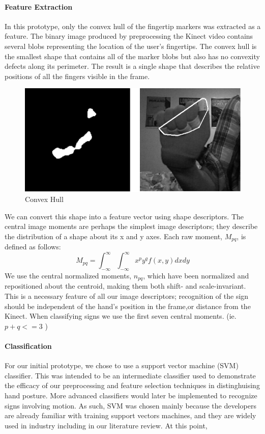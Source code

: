\documentclass[12pt]{article}
\begin{document}
\paragraph{Feature Extraction}
In this prototype, only the convex hull of the fingertip markers was extracted as a feature. The binary image produced by preprocessing the Kinect video contains several blobs representing the location of the user’s fingertips. The convex hull is the smallest shape that contains all of the marker blobs but also has no convexity defects along its perimeter. The result is a single shape that describes the relative positions of all the fingers visible in the frame.

\begin{figure}[h!]
  \centering
  \includegraphics[scale=0.7]{Hull.png}
  \caption{Convex Hull}
  \label{hull}
\end{figure}

We can convert this shape into a feature vector using shape descriptors. The central image moments are perhaps the simplest image descriptors; they describe the distribution of a shape about its x and y axes. Each raw moment, \(M_{pq}\), is defined as follows:
\begin{equation*}
M_{pq} = \int_{-\infty}^\infty \int_{-\infty}^\infty x^p y^q f(x,y) dxdy
\end{equation*}
We use the central normalized moments, \(n_{pq}\), which have been normalized and repositioned about the centroid, making them both shift- and scale-invariant. This is a necessary feature of all our image descriptors; recognition of the sign should be independent of the hand’s position in the frame,or distance from the Kinect. When classifying signs we use the first seven central moments. (ie. \(p + q  <= 3\) )

\paragraph{Classification}
For our initial prototype, we chose to use a support vector machine (SVM) classifier. This was intended to be an intermediate classifier used to demonstrate the efficacy of our preprocessing and feature selection techniques in distinghuising hand posture. More advanced classifiers would later be implemented to recognize signs involving motion. As such, SVM was chosen mainly because the developers are already familiar with training support vectors machines, and they are widely used in industry including in our literature review. At this point, 
\end{document}
